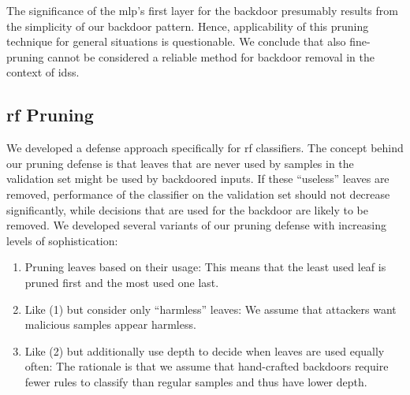\documentclass[10pt,sigconf,letterpaper,dvipsnames]{acmart}
\newcommand\note[2]{{\color{#1}#2}}
\newcommand\todo[1]{{\note{red}{TODO: #1}}}
\begin{document}
The significance of the \gls{mlp}'s first layer for the backdoor presumably results from the simplicity of our backdoor pattern. Hence, applicability of this pruning technique for general situations is questionable. We conclude that also fine-pruning cannot be considered a reliable method for backdoor removal in the context of \glspl{ids}.


\subsection{\gls{rf} Pruning}

We developed a defense approach specifically for \gls{rf} classifiers.
The concept behind our pruning defense is that leaves that are never used by samples in the validation set might be used by backdoored inputs. If these ``useless'' leaves are removed, performance of the classifier on the validation set should not decrease
significantly,
while decisions that are used for the backdoor are likely to be removed.
We developed several variants of our pruning defense with increasing levels of sophistication:
\begin{enumerate}[wide, labelwidth=!, labelindent=0pt]
\item Pruning leaves based on their usage: This means that the least used leaf is pruned first and the most used one last.
\item Like (1) but consider only ``harmless'' leaves: We assume that attackers want malicious samples appear harmless.
\item Like (2) but additionally use depth to decide when
leaves are used equally often: The rationale is that we assume that hand-crafted backdoors require fewer rules to classify than regular samples and thus have lower depth.
\end{enumerate}
\end{document}
